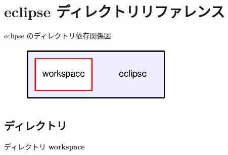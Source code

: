 \section{eclipse ディレクトリリファレンス}
\label{dir_89db577aa88594a56b7cb95279b1a768}
eclipse のディレクトリ依存関係図
\nopagebreak
\begin{figure}[H]
\begin{center}
\leavevmode
\includegraphics[width=212pt]{dir_89db577aa88594a56b7cb95279b1a768_dep}
\end{center}
\end{figure}
\subsection*{ディレクトリ}
\begin{DoxyCompactItemize}
\item 
ディレクトリ {\bf workspace}
\end{DoxyCompactItemize}
